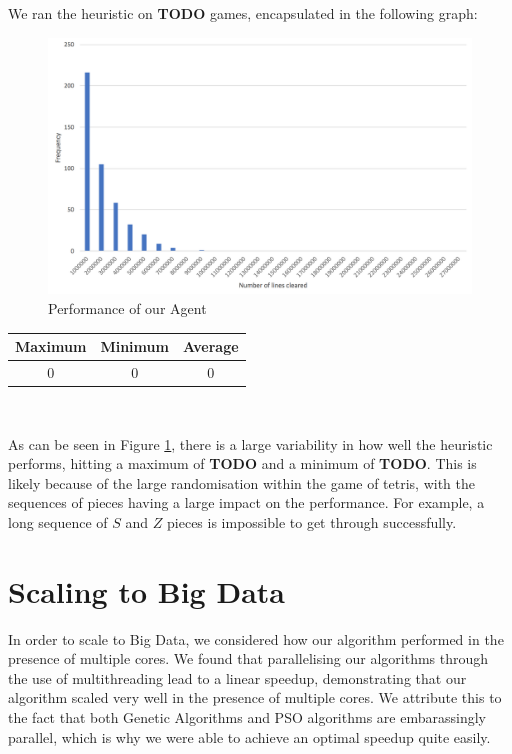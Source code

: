 \documentclass[12pt]{article}
\begin{document}
	We ran the heuristic on \textbf{TODO} games, encapsulated in the following graph:\\

	\begin{figure}[h]
		\includegraphics[scale=0.3]{heuristic/heuristic}
		\centering
		\caption{Performance of our Agent}
		\label{fig:agent}
	\end{figure}

	\vspace{-4mm}
	\begin{center}
		\begin{tabular}{ | c | c | c | }
			\hline
			Maximum & Minimum & Average \\ \hline
			0 & 0 & 0 \\ \hline
		\end{tabular}\\
	\end{center}

	As can be seen in Figure \ref{fig:agent}, there is a large variability in how
	well the heuristic performs, hitting a maximum of \textbf{TODO} and a minimum of \textbf{TODO}.
	This is likely because of the large randomisation within the game of tetris,
	with the sequences of pieces having a large impact on the performance. For example,
	a long sequence of $S$ and $Z$ pieces is impossible to get through successfully.

    \section{Scaling to Big Data}
	In order to scale to Big Data, we considered how our algorithm performed in the presence
	of multiple cores. We found that parallelising our algorithms through the use
	of multithreading lead to a linear speedup, demonstrating that our algorithm scaled very
	well in the presence of multiple cores. We attribute this to the fact that
	both Genetic Algorithms and PSO algorithms are embarassingly parallel, which
	is why we were able to achieve an optimal speedup quite easily.\\
\end{document}

